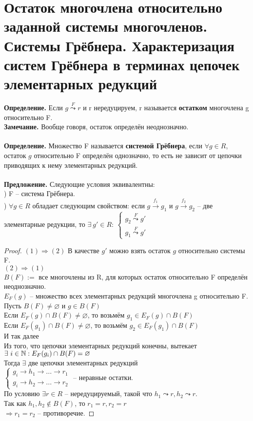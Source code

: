 \section{Остаток многочлена относительно заданной системы многочленов. Системы Грёбнера. Характеризация систем Грёбнера в терминах цепочек элементарных редукций}

\textbf{Определение.} Если $g\overset{F}{\leadsto}r$ и r нередуцируем, r называется \textbf{остатком} многочлена g относительно F.\\
\textbf{Замечание.} Вообще говоря, остаток определён неоднозначно.\\\\
\textbf{Определение.} Множество F называется \textbf{системой Грёбнера}, если $\forall g \in R$, остаток $g$ относительно F определён однозначно, то есть не зависит от цепочки приводящих к нему элементарных редукций.\\\\
\textbf{Предложение.} Следующие условия эквивалентны:\\
) F -- система Грёбнера.\\
) $\forall g\in R$ обладает следующим свойством: если $g\overset{f_1}{\to}g_1$ и $g\overset{f_2}{\to}g_2$ -- две элементарные редукции, то $\exists \ g'\in R:\ \begin{cases} g_2\overset{F}{\leadsto}g'\\g_1\overset{F}{\leadsto}g' \end{cases}$
\begin{proof}
    $(1)\Rightarrow (2)$ В качестве $g'$ можно взять остаток $g$ относительно системы F.\\
    $(2)\Rightarrow (1)$\\ $B(F):=$ все многочлены из R, для которых остаток относительно F определён неоднозначно.\\
    $E_F(g)$ -- множество всех элементарных редукций многочлена g относительно F.\\
    Пусть $B(F)\neq \varnothing$ и $g\in B(F)$\\
    Если $E_F(g)\cap B(F)\neq\varnothing$, то возьмём $g_1\in E_F(g)\cap B(F)$\\
    Если $E_F(g_1)\cap B(F)\neq\varnothing$, то возьмём $g_2\in E_F(g_1)\cap B(F)$\\
    И так далее\\
    Из того, что цепочки элементарных редукций конечны, вытекает $\exists \ i\in \mathbb{N}: E_F(g_i)\cap B(F)=\varnothing$\\
    Тогда $\exists $ две цепочки элементарных редукций\\
    $\begin{cases} g_i\to h_1\to ...\to r_1\\g_i\to h_2\to ...\to r_2 \end{cases}$ -- неравные остатки.\\
    По условию $\exists r\in R$ -- нередуцируемый, такой что $h_1\leadsto r, h_2\leadsto r$.\\
    Так как $h_1, h_2\not\in B(F)$, то $r_1=r, r_2=r$\\
    $\Rightarrow r_1=r_2$ -- противоречие.
\end{proof}